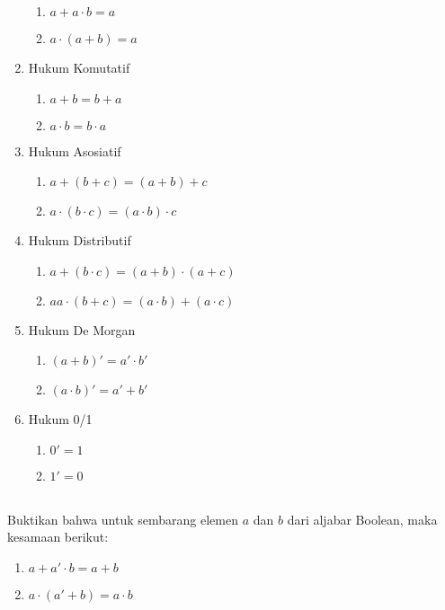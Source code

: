 \documentclass[11pt]{article}
\theoremstyle{definitionstyle}
\theoremstyle{theoremstyle}
\theoremstyle{examplestyle}
\begin{document}
\begin{multicols}{2}
\begin{enumerate}[left=0pt, itemsep=1.5pt, topsep=0pt]
\begin{enumerate}[left=0pt, itemsep=1.5pt, topsep=1.5pt, label=\roman*)]
            \item $a + a \cdot b = a$
            \item $a \cdot (a + b) = a$
        \end{enumerate}
        \item Hukum Komutatif
        \begin{enumerate}[left=0pt, itemsep=1.5pt, topsep=1.5pt, label=\roman*)]
            \item $a + b = b + a$
            \item $a \cdot b = b \cdot a$
        \end{enumerate}
        \columnbreak
        \item Hukum Asosiatif
        \begin{enumerate}[left=0pt, itemsep=1.5pt, topsep=1.5pt, label=\roman*)]
            \item $a + (b + c) = (a + b) + c$
            \item $a \cdot (b \cdot c) = (a \cdot b) \cdot c$
        \end{enumerate}
        \item Hukum Distributif
        \begin{enumerate}[left=0pt, itemsep=1.5pt, topsep=1.5pt, label=\roman*)]
            \item $a + (b \cdot c) = (a + b) \cdot (a + c)$
            \item $a a\cdot (b + c) = (a \cdot b) + (a \cdot c)$
        \end{enumerate}
        \item Hukum De Morgan
        \begin{enumerate}[left=0pt, itemsep=1.5pt, topsep=1.5pt, label=\roman*)]
            \item $(a + b)' = a' \cdot b'$
            \item $(a \cdot b)' = a' + b'$
        \end{enumerate}
        \item Hukum 0/1
        \begin{enumerate}[left=0pt, itemsep=1.5pt, topsep=1.5pt, label=\roman*)]
            \item $0' = 1$
            \item $1' = 0$
        \end{enumerate}
    \end{enumerate}
\end{multicols}
\begin{example} \hfill \\
    Buktikan bahwa untuk sembarang elemen $a$ dan $b$ dari aljabar Boolean, maka kesamaan berikut:
    \begin{enumerate}[left=0pt, itemsep=1.5pt, topsep=1.5pt]
        \item $a + a' \cdot b = a + b$
        \item $a \cdot (a' + b) = a \cdot b$
    \end{enumerate}
\end{example}
\end{document}
